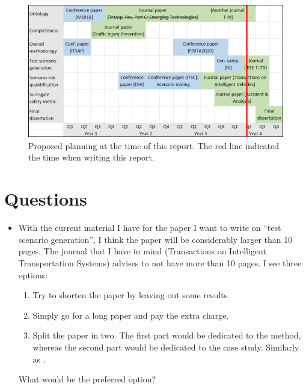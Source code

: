 \documentclass[10pt,final,a4paper,oneside,onecolumn]{article}
\begin{document}
\begin{figure}[b]
	\centering
	\includegraphics[width=\linewidth]{planning.png}
	\caption{Proposed planning at the time of this report. The red line indicated the time when writing this report.}
	\label{fig:planning}
\end{figure}



\section{Questions}

\begin{itemize}
	\item With the current material I have for the paper I want to write on ``test scenario generation'', I think the paper will be considerably larger than 10 pages. The journal that I have in mind (Transactions on Intelligent Transportation Systems) advises to not have more than 10 pages. I see three options:
	\begin{enumerate}
		\item Try to shorten the paper by leaving out some results.
		\item Simply go for a long paper and pay the extra charge.
		\item Split the paper in two. The first part would be dedicated to the method, whereas the second part would be dedicated to the case study. Similarly as \autocite{feng2020testing, feng2020testing2}.
	\end{enumerate}
	What would be the preferred option?
\end{itemize}


\printbibliography

%
\end{document}
